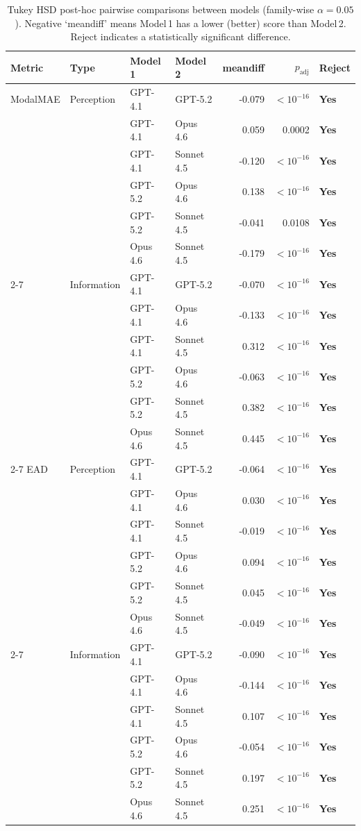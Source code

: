 \begin{table}[htbp]
\centering
\scriptsize
\setlength{\tabcolsep}{4pt}
\caption{Tukey HSD post-hoc pairwise comparisons between models (family-wise $\alpha{=}0.05$). Negative `meandiff' means Model\,1 has a lower (better) score than Model\,2. Reject indicates a statistically significant difference.}
\label{tab:tukey}
\begin{tabular}{llllrrl}
\toprule
\textbf{Metric} & \textbf{Type} & \textbf{Model 1} & \textbf{Model 2} & \textbf{meandiff} & $p_{\text{adj}}$ & \textbf{Reject} \\
\midrule
ModalMAE & Perception & GPT-4.1 & GPT-5.2 & -0.079 & $<10^{-16}$ & \textbf{Yes} \\
 &  & GPT-4.1 & Opus 4.6 & 0.059 & 0.0002 & \textbf{Yes} \\
 &  & GPT-4.1 & Sonnet 4.5 & -0.120 & $<10^{-16}$ & \textbf{Yes} \\
 &  & GPT-5.2 & Opus 4.6 & 0.138 & $<10^{-16}$ & \textbf{Yes} \\
 &  & GPT-5.2 & Sonnet 4.5 & -0.041 & 0.0108 & \textbf{Yes} \\
 &  & Opus 4.6 & Sonnet 4.5 & -0.179 & $<10^{-16}$ & \textbf{Yes} \\
\cmidrule(lr){2-7}
 & Information & GPT-4.1 & GPT-5.2 & -0.070 & $<10^{-16}$ & \textbf{Yes} \\
 &  & GPT-4.1 & Opus 4.6 & -0.133 & $<10^{-16}$ & \textbf{Yes} \\
 &  & GPT-4.1 & Sonnet 4.5 & 0.312 & $<10^{-16}$ & \textbf{Yes} \\
 &  & GPT-5.2 & Opus 4.6 & -0.063 & $<10^{-16}$ & \textbf{Yes} \\
 &  & GPT-5.2 & Sonnet 4.5 & 0.382 & $<10^{-16}$ & \textbf{Yes} \\
 &  & Opus 4.6 & Sonnet 4.5 & 0.445 & $<10^{-16}$ & \textbf{Yes} \\
\cmidrule(lr){2-7}
EAD & Perception & GPT-4.1 & GPT-5.2 & -0.064 & $<10^{-16}$ & \textbf{Yes} \\
 &  & GPT-4.1 & Opus 4.6 & 0.030 & $<10^{-16}$ & \textbf{Yes} \\
 &  & GPT-4.1 & Sonnet 4.5 & -0.019 & $<10^{-16}$ & \textbf{Yes} \\
 &  & GPT-5.2 & Opus 4.6 & 0.094 & $<10^{-16}$ & \textbf{Yes} \\
 &  & GPT-5.2 & Sonnet 4.5 & 0.045 & $<10^{-16}$ & \textbf{Yes} \\
 &  & Opus 4.6 & Sonnet 4.5 & -0.049 & $<10^{-16}$ & \textbf{Yes} \\
\cmidrule(lr){2-7}
 & Information & GPT-4.1 & GPT-5.2 & -0.090 & $<10^{-16}$ & \textbf{Yes} \\
 &  & GPT-4.1 & Opus 4.6 & -0.144 & $<10^{-16}$ & \textbf{Yes} \\
 &  & GPT-4.1 & Sonnet 4.5 & 0.107 & $<10^{-16}$ & \textbf{Yes} \\
 &  & GPT-5.2 & Opus 4.6 & -0.054 & $<10^{-16}$ & \textbf{Yes} \\
 &  & GPT-5.2 & Sonnet 4.5 & 0.197 & $<10^{-16}$ & \textbf{Yes} \\
 &  & Opus 4.6 & Sonnet 4.5 & 0.251 & $<10^{-16}$ & \textbf{Yes} \\
\midrule
\bottomrule
\end{tabular}
\end{table}